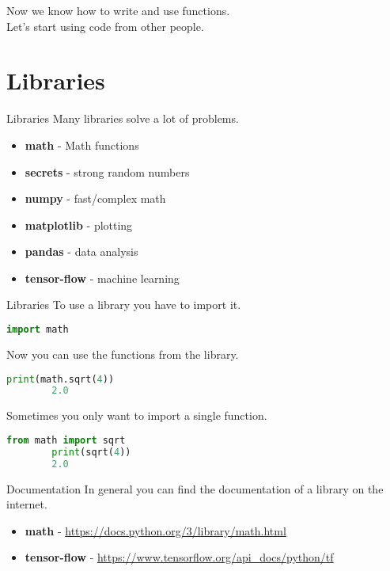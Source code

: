 \documentclass{beamer}
\begin{document}
\begin{frame}
    Now we know how to write and use functions.\\ \pause
    Let's start using code from other people.
\end{frame}

\section{Libraries}

\begin{frame}{Libraries}
    Many libraries solve a lot of problems.\\ \pause
    \begin{itemize}
        \item \textbf{math} - Math functions
        \item \textbf{secrets} - strong random numbers
        \item \textbf{numpy} - fast/complex math
        \item \textbf{matplotlib} - plotting
        \item \textbf{pandas} - data analysis
        \item \textbf{tensor-flow} - machine learning
    \end{itemize}
\end{frame}

\begin{frame}[fragile]{Libraries}
    To use a library you have to import it.\\ \pause
    \begin{lstlisting}[backgroundcolor = \color{lightgray},language=Python]
        import math
    \end{lstlisting}
    \pause
    Now you can use the functions from the library.\\ \pause
    \begin{lstlisting}[backgroundcolor = \color{lightgray},language=Python]
        print(math.sqrt(4))
        2.0
    \end{lstlisting}
    Sometimes you only want to import a single function.\\ \pause
    \begin{lstlisting}[backgroundcolor = \color{lightgray},language=Python]
        from math import sqrt
        print(sqrt(4))
        2.0
    \end{lstlisting}
\end{frame}

\begin{frame}{Documentation}
    In general you can find the documentation of a library on the internet.\\ \pause
    \begin{itemize}
        \item \textbf{math} - \href{https://docs.python.org/3/library/math.html}{https://docs.python.org/3/library/math.html}
        \item \textbf{tensor-flow} - \href{https://www.tensorflow.org/api\_docs/python/tf}{https://www.tensorflow.org/api\_docs/python/tf}
    \end{itemize}
\end{frame}
\end{document}
